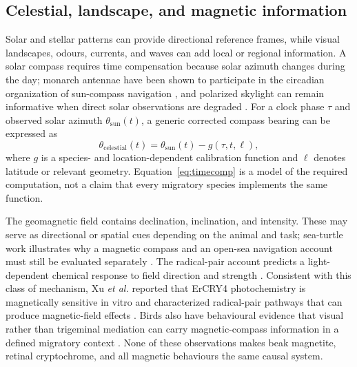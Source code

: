 \documentclass[conference]{IEEEtran}
\begin{document}
\subsection{Celestial, landscape, and magnetic information}
Solar and stellar patterns can provide directional reference frames, while visual landscapes, odours, currents, and waves can add local or regional information. A solar compass requires time compensation because solar azimuth changes during the day; monarch antennae have been shown to participate in the circadian organization of sun-compass navigation \cite{merlin2009}, and polarized skylight can remain informative when direct solar observations are degraded \cite{muheim2006}. For a clock phase $\tau$ and observed solar azimuth $\theta_{\mathrm{sun}}(t)$, a generic corrected compass bearing can be expressed as
\begin{equation}
\theta_{\mathrm{celestial}}(t)=\theta_{\mathrm{sun}}(t)-g(\tau,t,\ell),
\label{eq:timecomp}
\end{equation}
where $g$ is a species- and location-dependent calibration function and $\ell$ denotes latitude or relevant geometry. Equation~\eqref{eq:timecomp} is a model of the required computation, not a claim that every migratory species implements the same function.

The geomagnetic field contains declination, inclination, and intensity. These may serve as directional or spatial cues depending on the animal and task; sea-turtle work illustrates why a magnetic compass and an open-sea navigation account must still be evaluated separately \cite{lohmann1996}. The radical-pair account predicts a light-dependent chemical response to field direction and strength \cite{ritz2000,hore2016}. Consistent with this class of mechanism, Xu \emph{et al.} reported that ErCRY4 photochemistry is magnetically sensitive in vitro and characterized radical-pair pathways that can produce magnetic-field effects \cite{xu2021}. Birds also have behavioural evidence that visual rather than trigeminal mediation can carry magnetic-compass information in a defined migratory context \cite{zapka2009}. None of these observations makes beak magnetite, retinal cryptochrome, and all magnetic behaviours the same causal system.
\end{document}
